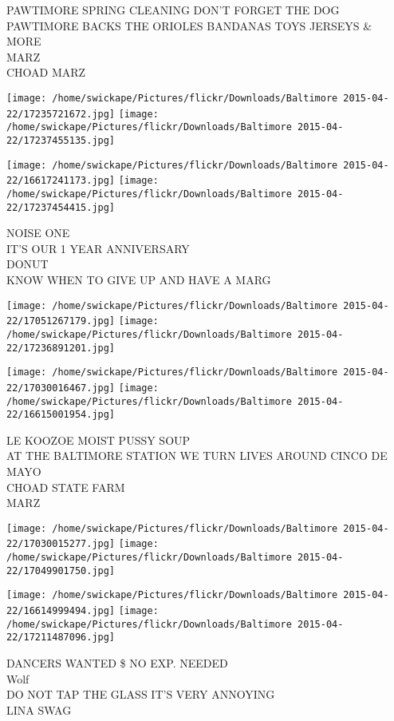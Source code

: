\documentclass[10pt,letterpaper]{article}
\begin{document}
PAWTIMORE SPRING CLEANING DON'T FORGET THE DOG\\
PAWTIMORE BACKS THE ORIOLES BANDANAS TOYS JERSEYS \& MORE\\
MARZ\\
CHOAD MARZ
\pagebreak

\texttt{[image: /home/swickape/Pictures/flickr/Downloads/Baltimore 2015-04-22/17235721672.jpg]}
\texttt{[image: /home/swickape/Pictures/flickr/Downloads/Baltimore 2015-04-22/17237455135.jpg]}

\texttt{[image: /home/swickape/Pictures/flickr/Downloads/Baltimore 2015-04-22/16617241173.jpg]}
\texttt{[image: /home/swickape/Pictures/flickr/Downloads/Baltimore 2015-04-22/17237454415.jpg]}

NOISE ONE\\
IT'S OUR 1 YEAR ANNIVERSARY\\
DONUT\\
KNOW WHEN TO GIVE UP AND HAVE A MARG
\pagebreak

\texttt{[image: /home/swickape/Pictures/flickr/Downloads/Baltimore 2015-04-22/17051267179.jpg]}
\texttt{[image: /home/swickape/Pictures/flickr/Downloads/Baltimore 2015-04-22/17236891201.jpg]}

\texttt{[image: /home/swickape/Pictures/flickr/Downloads/Baltimore 2015-04-22/17030016467.jpg]}
\texttt{[image: /home/swickape/Pictures/flickr/Downloads/Baltimore 2015-04-22/16615001954.jpg]}

LE KOOZOE MOIST PUSSY SOUP\\
AT THE BALTIMORE STATION WE TURN LIVES AROUND CINCO DE MAYO\\
CHOAD STATE FARM\\
MARZ
\pagebreak

\texttt{[image: /home/swickape/Pictures/flickr/Downloads/Baltimore 2015-04-22/17030015277.jpg]}
\texttt{[image: /home/swickape/Pictures/flickr/Downloads/Baltimore 2015-04-22/17049901750.jpg]}

\texttt{[image: /home/swickape/Pictures/flickr/Downloads/Baltimore 2015-04-22/16614999494.jpg]}
\texttt{[image: /home/swickape/Pictures/flickr/Downloads/Baltimore 2015-04-22/17211487096.jpg]}

DANCERS WANTED \$ NO EXP. NEEDED\\
Wolf\\
DO NOT TAP THE GLASS IT'S VERY ANNOYING\\
LINA SWAG
\pagebreak
\end{document}
